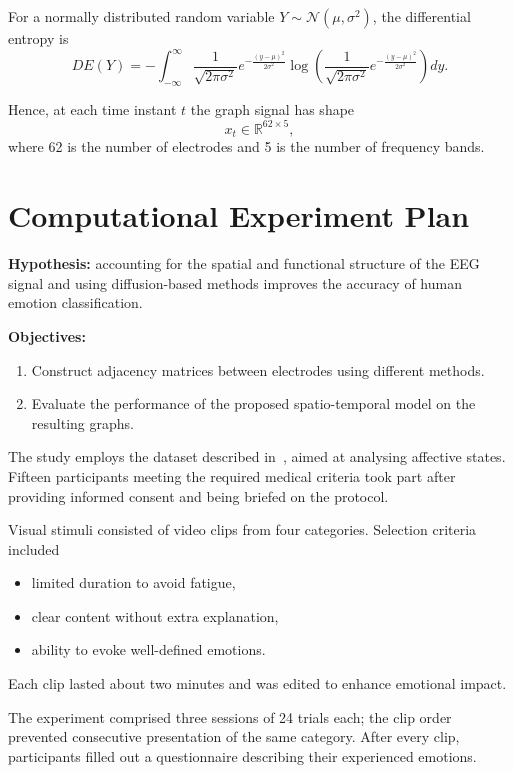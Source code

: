 \documentclass[12pt, twoside]{article}
\begin{document}
For a normally distributed random variable $Y \sim \mathcal{N}(\mu,\sigma^2)$, the differential entropy is
\begin{equation}
DE(Y) = -\int_{-\infty}^{\infty} 
\frac{1}{\sqrt{2\pi\sigma^2}}
e^{-\frac{(y-\mu)^2}{2\sigma^2}}
\log\!\left(
\frac{1}{\sqrt{2\pi\sigma^2}}
e^{-\frac{(y-\mu)^2}{2\sigma^2}}
\right)dy.
\end{equation}

Hence, at each time instant $t$ the graph signal has shape
\[
x_t \in \mathbb{R}^{62 \times 5},
\]
where 62 is the number of electrodes and 5 is the number of frequency bands.

\section{Computational Experiment Plan}

\textbf{Hypothesis:} accounting for the spatial and functional structure of the EEG signal and using diffusion-based methods improves the accuracy of human emotion classification.

\textbf{Objectives:}
\begin{enumerate}
    \item Construct adjacency matrices between electrodes using different methods.
    \item Evaluate the performance of the proposed spatio-temporal model on the resulting graphs.
\end{enumerate}

The study employs the dataset described in~\cite{Dataset}, aimed at analysing affective states. Fifteen participants meeting the required medical criteria took part after providing informed consent and being briefed on the protocol.

Visual stimuli consisted of video clips from four categories. Selection criteria included
\begin{itemize}
    \item limited duration to avoid fatigue,
    \item clear content without extra explanation,
    \item ability to evoke well-defined emotions.
\end{itemize}
Each clip lasted about two minutes and was edited to enhance emotional impact.

The experiment comprised three sessions of 24 trials each; the clip order prevented consecutive presentation of the same category. After every clip, participants filled out a questionnaire describing their experienced emotions.
\end{document}
